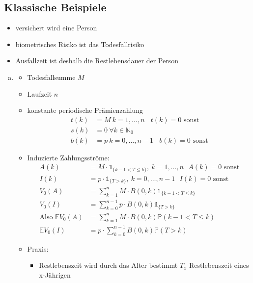 \subsection{Klassische Beispiele}
\label{sub:klassische_beispiele}
\begin{itemize}
	\item versichert wird eine Person
	\item biometrisches Risiko ist das Todesfallrisiko
	\item Ausfallzeit ist deshalb die Restlebensdauer der Person
\end{itemize}
\begin{enumerate}[(a)]
	\item {}
	\begin{itemize}
		\item Todesfallsumme $M$
		\item Laufzeit $n$
		\item konstante periodische Prämienzahlung
		\begin{equation*}
		\begin{aligned}
			t(k) &= M ~ k=1,\dots,n~~~~t(k)=0 \text{ sonst}\\
			s(k) &= 0 ~ \forall k \in \mathds{N}_0\\
			b(k) &= p ~k=0,\dots,n-1~~~~b(k)=0 \text{ sonst}
		\end{aligned}
		\end{equation*}
		\item Induzierte Zahlungsströme:
		\begin{equation*}
		\begin{aligned}
			A(k) &= M\cdot \mathbb{1}_{\{k-1<T\le k\}},~k=1,\dots,n~~~A(k)=0 \text{ sonst}\\
			I(k) &= p\cdot \mathbb{1}_{\{T>k\}},~k=0,\dots,n-1~~~I(k)=0 \text{ sonst}\\
			V_0(A) &= \sum_{k=1}^{n}M\cdot B(0,k) \mathbb{1}_{\{k-1<T\le k \}}\\
			V_0(I) &= \sum_{k=0}^{n-1} p\cdot B(0,k) \mathbb{1}_{\{T>k \}}\\
			\text{Also } \mathds{E}V_0(A) &= \sum_{k=1}^{n}M\cdot B(0,k) \mathds{P}(k-1<T\le k)\\
			\mathds{E}V_0(I) &= p\cdot \sum_{k=0}^{n-1}B(0,k) \mathds{P}(T>k)
		\end{aligned}
		\end{equation*}
		\item Praxis:
		\begin{itemize}
			\item Restlebenszeit wird durch das Alter bestimmt $T_x$ Restlebenszeit eines x-Jährigen

\end{itemize}
\end{itemize}
\end{enumerate}
